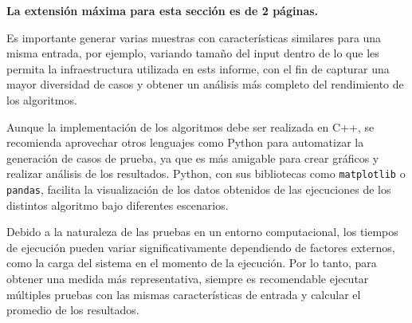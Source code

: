 \begin{mdframed}
    \textbf{La extensión máxima para esta sección es de 2 páginas.}
\end{mdframed}
Es importante generar varias muestras con características similares para una misma entrada, por ejemplo, variando tamaño del input dentro de lo que les permita la infraestructura utilizada en ests informe, con el fin de capturar una mayor diversidad de casos y obtener un análisis más completo del rendimiento de los algoritmos.

\begin{mdframed}
    Aunque la implementación de los algoritmos debe ser realizada en C++, se recomienda aprovechar otros lenguajes como Python para automatizar la generación de casos de prueba, ya que es más amigable para crear gráficos y realizar análisis de los resultados. Python, con sus bibliotecas como \texttt{matplotlib} o \texttt{pandas}, facilita la visualización de los datos obtenidos de las ejecuciones de los distintos algoritmo bajo diferentes escenarios.
\end{mdframed}    

\begin{mdframed}    
    Debido a la naturaleza de las pruebas en un entorno computacional, los tiempos de ejecución pueden variar significativamente dependiendo de factores externos, como la carga del sistema en el momento de la ejecución. Por lo tanto, para obtener una medida más representativa, siempre es recomendable ejecutar múltiples pruebas con las mismas características de entrada y calcular el promedio de los resultados.
\end{mdframed}